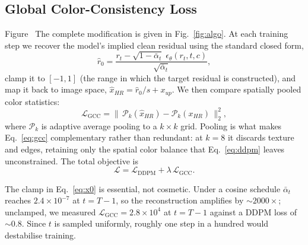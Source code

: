 \documentclass[11pt]{article}
\begin{document}
\subsection{Global Color-Consistency Loss}

Figure~
The complete modification is given in Fig.~\ref{fig:algo}. At each training step we
recover the model's implied clean residual using the standard closed form,
\begin{equation}
\hat r_0 = \frac{r_t - \sqrt{1-\bar\alpha_t}\;\epsilon_\theta(r_t,t,c)}{\sqrt{\bar\alpha_t}},
\label{eq:x0}
\end{equation}
clamp it to $[-1,1]$ (the range in which the target residual is constructed), and
map it back to image space, $\hat x_{HR} = \hat r_0 / s + x_{up}$. We then compare
spatially pooled color statistics:
\begin{equation}
\mathcal{L}_{\text{GCC}} =
\big\| \, \mathcal{P}_k(\hat x_{HR}) - \mathcal{P}_k(x_{HR}) \, \big\|_2^2 ,
\label{eq:gcc}
\end{equation}
where $\mathcal{P}_k$ is adaptive average pooling to a $k \times k$ grid. Pooling
is what makes Eq.~\ref{eq:gcc} complementary rather than redundant: at $k=8$ it
discards texture and edges, retaining only the spatial color balance that
Eq.~\ref{eq:ddpm} leaves unconstrained. The total objective is
\begin{equation}
\mathcal{L} = \mathcal{L}_{\text{DDPM}} + \lambda\,\mathcal{L}_{\text{GCC}}.
\end{equation}

The clamp in Eq.~\ref{eq:x0} is essential, not cosmetic. Under a cosine schedule
$\bar\alpha_t$ reaches $2.4\times10^{-7}$ at $t = T-1$, so the reconstruction
amplifies by ${\sim}2000\times$; unclamped, we measured
$\mathcal{L}_{\text{GCC}} = 2.8\times10^{4}$ at $t=T-1$ against a DDPM loss of
${\sim}0.8$. Since $t$ is sampled uniformly, roughly one step in a hundred would
destabilise training.
\end{document}
